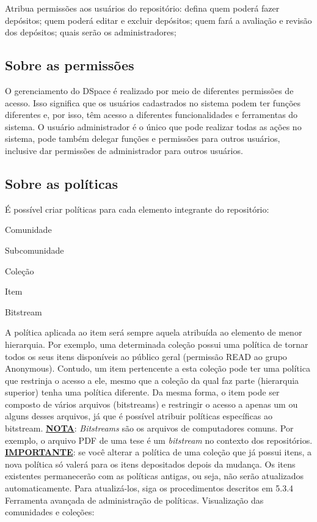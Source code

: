 \documentclass[12pt,hidelinks]{article}
\begin{document}
        \textbullet \hspace{6pt} Atribua permissões aos usuários do repositório: defina quem poderá fazer depósitos; quem poderá editar e excluir depósitos; quem fará a avaliação e revisão dos depósitos; quais serão os administradores;

        \subsection{Sobre as permissões}
        O gerenciamento do DSpace é realizado por meio de diferentes permissões de acesso. Isso significa que os usuários cadastrados no sistema podem ter funções diferentes e, por isso, têm acesso a diferentes funcionalidades e ferramentas do sistema. O usuário administrador é o único que pode realizar todas as ações no sistema, pode também delegar funções e permissões para outros usuários, inclusive dar permissões de administrador para outros usuários.
        
        \subsection{Sobre as políticas}
        É possível criar políticas para cada elemento integrante do repositório:
        
            \centerline{Comunidade}      
            \centerline{Subcomunidade}      
            \centerline{Coleção}      
            \centerline{Item}      
            \centerline{Bitstream}
        \singlespacing
        A política aplicada ao item será sempre aquela atribuída ao elemento de menor hierarquia. Por exemplo, uma determinada coleção possui uma política de tornar todos os seus itens disponíveis ao público geral (permissão READ ao grupo Anonymous). Contudo, um item pertencente a esta coleção pode ter uma política que restrinja o acesso a ele, mesmo que a coleção da qual faz parte (hierarquia superior) tenha uma política diferente. Da mesma forma, o item pode ser composto de vários arquivos (bitstreams) e restringir o acesso a apenas um ou alguns desses arquivos, já que é possível atribuir políticas específicas ao bitstream.
        \singlespacing
        \textbf{\underline{NOTA}}: \emph{Bitstreams}  são os arquivos de computadores comuns. Por exemplo, o arquivo PDF de uma tese é um \emph{bitstream} no contexto dos repositórios.
        \singlespacing
        \textbf{\underline{IMPORTANTE}}: se você alterar a política de uma coleção que já possui itens, a nova política só valerá para os itens depositados depois da mudança. Os itens existentes permanecerão com as políticas antigas, ou seja, não serão atualizados automaticamente. Para atualizá-los, siga os procedimentos descritos em 5.3.4 Ferramenta avançada de administração de políticas.
\newpage
        Visualização das comunidades e coleções:
        
\end{document}

